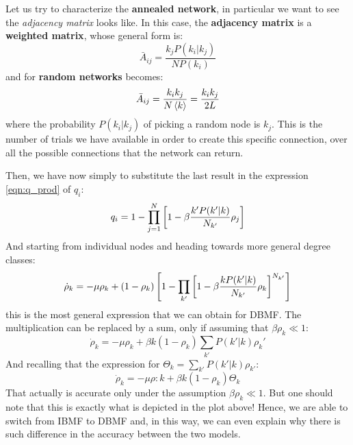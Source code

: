 \documentclass[../main/main.tex]{subfiles}
\begin{document}
Let us try to characterize the \textbf{annealed network}, in particular we want to see the \textit{adjacency matrix} looks like. In this case, the \textbf{adjacency matrix} is a \textbf{weighted matrix}, whose general form is:
\begin{equation*}
  \bar{A}_{ij} = \frac{k_j P(k_i|k_j)}{N P (k_i)}
\end{equation*}
and for \textbf{random networks} becomes:
\begin{equation*}
  \bar{A}_{ij} = \frac{k_i k_j}{N \expval{k} } = \frac{k_i k_j}{2 L}
\end{equation*}
where the probability  \(  P(k_i|k_j) \) of picking a random node is \( k_j \). This is the number of trials we have available in order to create this specific connection, over all the possible connections that the network can return.

Then, we have now simply to substitute the last result in the expression \ref{eqn:q_prod} of \( q_i \):
\begin{equation*}
  q_i = 1 - \prod_{j=1}^{N} \qty[1 - \beta \frac{k' P(k'|k)}{N_{k'}} \rho _j]
\end{equation*}
And starting from individual nodes and heading towards more general degree classes:
\begin{equation*}
  \dot{\rho }_k = - \mu \rho _k + (1- \rho _k)\left[ 1 - \prod_{k'} \qty[1 - \beta \frac{k P(k'|k)}{N_{k'}} \rho _k]^{N_{k'}} \right]
\end{equation*}
this is the most general expression that we can obtain for DBMF.
The multiplication can be replaced by a sum, only if assuming that \( \beta \rho _k \ll 1 \):
\begin{equation*}
  \dot{\rho }_ k = - \mu \rho_k + \beta k (1-\rho_k) \sum_{k'}P(k'|k)\rho_k'
\end{equation*}
And recalling that the expression for $\Theta_k = \sum_{k'}P(k'|k)\rho_{k'}$:
\begin{equation*}
   \dot{\rho }_ k = - \mu \rho:k + \beta k (1-\rho_k) \Theta_k
\end{equation*}
That actually is accurate only under the assumption \( \beta \rho _k \ll 1 \). But one should note that this is exactly what is depicted in the plot above! Hence, we are able to switch from IBMF to DBMF and, in this way, we can even explain why there is such difference in the accuracy between the two models.
\end{document}
